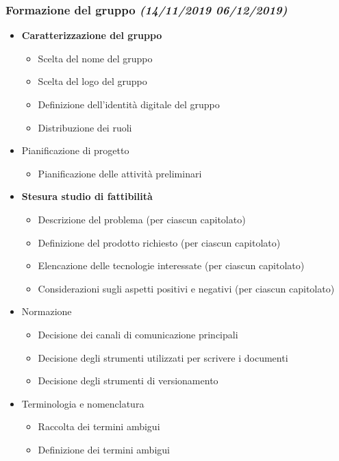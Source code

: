 \documentclass[../piano-di-progetto.tex]{subfiles}
\begin{document}
\subsubsection[Formazione del gruppo]{Formazione del gruppo {\normalsize\normalfont\itshape(14/11/2019  06/12/2019)}}%
\label{subs:formazione_del_gruppo}
\begin{itemize}
  \item \textbf{Caratterizzazione del gruppo}
  \begin{itemize}
    \item Scelta del nome del gruppo
    \item Scelta del logo del gruppo
    \item Definizione dell'identità digitale del gruppo
    \item Distribuzione dei ruoli
  \end{itemize}
  \item Pianificazione di progetto
  \begin{itemize}
    \item Pianificazione delle attività preliminari
  \end{itemize}
  \item \textbf{Stesura studio di fattibilità}
  \begin{itemize}
    \item Descrizione del problema (per ciascun capitolato)
    \item Definizione del prodotto richiesto (per ciascun capitolato)
    \item Elencazione delle tecnologie interessate (per ciascun capitolato)
    \item Considerazioni sugli aspetti positivi e negativi (per ciascun capitolato)
  \end{itemize}
  \item Normazione
  \begin{itemize}
    \item Decisione dei canali di comunicazione principali
    \item Decisione degli strumenti utilizzati per scrivere i documenti
    \item Decisione degli strumenti di versionamento
  \end{itemize}
  \item Terminologia e nomenclatura
  \begin{itemize}
    \item Raccolta dei termini ambigui
    \item Definizione dei termini ambigui
  \end{itemize}
\end{itemize}
\end{document}
